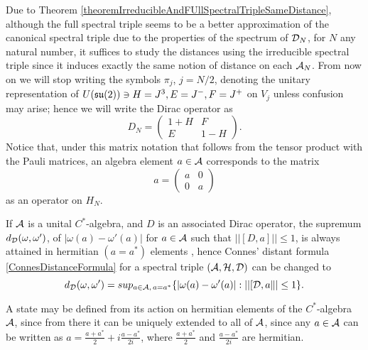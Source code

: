 Due to Theorem \ref{theoremIrreducibleAndFUllSpectralTripleSameDistance}, although the full spectral triple seems to be a better approximation of the canonical spectral triple due to the properties of the spectrum of $\mathcal D_N$, for $N$ any natural number, it suffices to study the distances using the irreducible spectral triple since it induces exactly the same notion of distance on each $\mathcal A_N$. From now on we will stop writing the symbols $\pi_j$, $j = N/2$, denoting the unitary representation of $U(\mathfrak{su}(2)) \ni H = J^3, E = J^-, F = J^+$ on $V_j$ unless confusion may arise; hence we will write the Dirac operator as
\begin{equation}
    D_N = \begin{pmatrix} 1 + H & F \\ E & 1 - H\end{pmatrix}.
\end{equation}
Notice that, under this matrix notation that follows from the tensor product with the Pauli matrices, an algebra element $a \in \mathcal A$ corresponds to the matrix
\begin{equation}\label{aAsMatrixOperator}
    a = \begin{pmatrix} a & 0 \\ 0 & a \end{pmatrix}
\end{equation} as an operator on $H_N$.

\begin{remark}
If $\mathcal A$ is a unital $C^*$-algebra, and $D$ is an associated Dirac operator, the supremum  $d_\mathcal D(\omega, \omega')$, of $|\omega(a) - \omega'(a)|$ for $a \in \mathcal A$ such that $||[D, a]|| \leq 1$, is always attained in hermitian $(a = a^*)$ elements \cite{Iochum2001}, hence Connes' distant formula \eqref{ConnesDistanceFormula} for a spectral triple $(\mathcal A, \mathcal H, \mathcal D)$ can be changed to
\begin{equation} \label{distanceFormulaHermitian}
    d_\mathcal D(\omega, \omega') = sup_{a \in \mathcal A, \,a = a^*} \{|\omega(a) - \omega'(a)| : ||[\mathcal D, a\|| \leq 1\}.
\end{equation}
\end{remark}

\begin{remark}
A state may be defined from its action on hermitian elements of the $C^*$-algebra $\mathcal A$, since from there it can be uniquely extended to all of $\mathcal A$, since any $a \in \mathcal A$ can be written as $a = \frac{a+a^*}{2} + i \frac{a - a^*}{2i}$, where $\frac{a+a^*}{2}$ and $\frac{a-a^*}{2i}$ are hermitian.
\end{remark}

